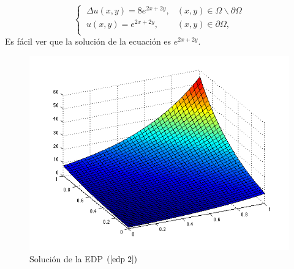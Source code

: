 \documentclass[11pt,a4paper]{article}
\begin{document}
\begin{equation}
\left \lbrace \begin{array}{cc}
\ \Delta u(x,y)=8e^{2x+2y}, & (x,y) \in \Omega\backslash \partial \Omega \\
\ u(x,y)=e^{2x+2y}, & (x,y)\in \partial \Omega, \\
\end{array} \right.
\label{edp 2}
\end{equation}
Es fácil ver que la solución de la ecuación es $e^{2x+2y}$. 
\begin{figure}[H]
\centering
\includegraphics[scale=.5]{u3.png}
\caption{Solución de la EDP $(\ref{edp 2})$}
\end{figure}
\end{document}
